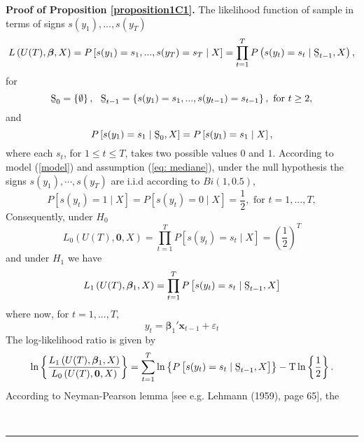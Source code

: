 \documentclass[harvard,11pt]{article}
\newenvironment{proof}[1][Proof]{\textbf{#1.} }{\  \rule{0.5em}{0.5em}}
\begin{document}
\begin{proof}[Proof of Proposition \protect\ref{proposition1C1}]
The likelihood function of sample in terms of signs $s(y_{1}),...,s(y_{T})$%
\begin{equation*}
L\left( U(T),\bm{\beta},X \right) =P\left[
s(y_{1})=s_{1},...,s(y_{T})=s_{T}\mid X\right] =\prod\limits_{t=1}^{T}%
P\left( s(y_{t})=s_{t}\mid \text{\b{S}}_{t-1},X\right) ,
\end{equation*}%
for 
\begin{equation*}
\text{\b{S}}_{0}=\left\{ \emptyset \right\} ,\text{ \ \b{S}}_{t-1}=\left\{
s(y_{1})=s_{1},...,s(y_{t-1})=s_{t-1}\right\} ,\text{ for }t\geq 2,
\end{equation*}%
and%
\begin{equation*}
P\left[ s(y_{1})=s_{1}\mid \text{\b{S}}_{0},X\right] =P%
\left[ s(y_{1})=s_{1}\mid X\right] ,
\end{equation*}%
where each $s_{t}$, for $1\leq t\leq T$, takes two possible values $0$ and $%
1 $. According to model (\ref{model}) and assumption (\ref{eq: mediane}), under the null hypothesis the signs $s(y_1),\cdots,s(y_T)$ are i.i.d according to $Bi(1,0.5)$,
\begin{equation*}
P\left[ s(y_{t})=1\mid X\right] =P\left[ s(y_{t})=0\mid X\right] =%
\frac{1}{2},\text{ for }t=1,...,T,
\end{equation*}%
Consequently, under $H_{0}$%
\begin{equation*}
L_{0}\left( U(T),\bm{0},X\right) =\prod\limits_{t=1}^{T}P\left[ s(y_{t})=s_{t}\mid X\right] =\left( \frac{1}{2}\right) ^{T}
\end{equation*}%
and under $H_{1}$ we have%
\begin{equation*}
L_{1}\left( U(T),\bm{\beta}_{1},X\right) =\prod\limits_{t=1}^{T}%
P\left[ s(y_{t})=s_{t}\mid \text{\b{S}}_{t-1}, X\right]
\end{equation*}%
where now, for $t=1,...,T,$%
\begin{equation*}
y_{t}=\bm{\beta}_1'\bm{x}_{t-1}+\varepsilon_{t}
\end{equation*}%
The log-likelihood ratio is given by%
\begin{equation*}
\ln \left\{ \frac{L_{1}\left( U(T),\bm{\beta}_{1},X\right) }{L%
_{0}\left( U(T),\bm{0},X\right) }\right\} =\sum\limits_{t=1}^{T}\ln \left\{ 
P\left[ s(y_{t})=s_{t}\mid \text{\b{S}}_{t-1},X\right] \right\} -\text{T}\ln
\left\{ \frac{1}{2}\right\} .
\end{equation*}%
According to Neyman-Pearson lemma [see e.g. Lehmann (1959), page 65], the

\end{proof}
\end{document}
